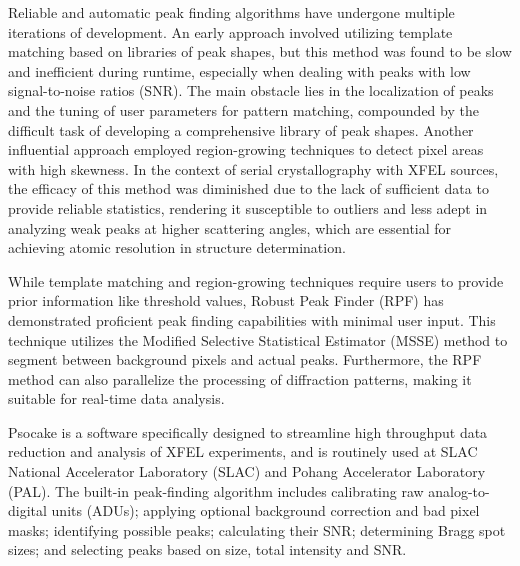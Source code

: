 \documentclass[conference]{IEEEtran}
\newcommand{\psocake}{Psocake}
\begin{document}
Reliable and automatic peak finding algorithms have undergone multiple
iterations of development.  An early approach involved utilizing template
matching \citep{wilkinsonIntegrationSinglecrystalReflections1988a} based on
libraries of peak shapes, but this method was found to be slow and inefficient
during runtime, especially when dealing with peaks with low signal-to-noise ratios
(SNR).  The main obstacle lies in the localization of peaks and the tuning of
user parameters for pattern matching, compounded by the difficult task of
developing a comprehensive library of peak shapes.  Another influential approach
employed region-growing techniques
\citep{bolotovskySeedSkewnessMethodIntegration1995,
bartyCheetahSoftwareHighthroughput2014} to detect pixel areas with high
skewness.  In the context of serial crystallography with XFEL sources, the
efficacy of this method was diminished due to the lack of sufficient data to
provide reliable statistics, rendering it susceptible to outliers and less adept
in analyzing weak peaks at higher scattering angles, which are essential for
achieving atomic resolution in structure determination.

While template matching and region-growing techniques require users to provide
prior information like threshold values, Robust Peak Finder (RPF)
\citep{hadian-jaziPeakfindingAlgorithmBased2017,
hadian-jaziDataReductionSerial2021} has demonstrated proficient peak finding
capabilities with minimal user input.  This technique utilizes the Modified
Selective Statistical Estimator (MSSE) method to segment between background
pixels and actual peaks.  Furthermore, the RPF method can also parallelize the
processing of diffraction patterns, making it suitable for real-time data analysis.

\psocake{} is a software specifically designed to streamline high throughput
data reduction and analysis of XFEL experiments, and is routinely used at SLAC
National Accelerator Laboratory (SLAC) and Pohang Accelerator Laboratory (PAL).
The built-in peak-finding algorithm \citep{shinDataAnalysisUsing2018} includes
calibrating raw analog-to-digital units (ADUs); applying optional background
correction and bad pixel masks; identifying possible peaks; calculating their
SNR; determining Bragg spot sizes; and selecting peaks based on size, total
intensity and SNR.
\end{document}
